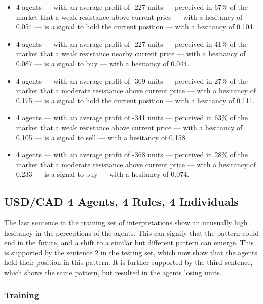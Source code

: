 {\small
  \begin{itemize}
  \item 4 agents — with an average profit of -227 units — perceived in 67\% of
    the market that a weak resistance above current price — with a hesitancy of
    0.054 — is a signal to hold the current position — with a hesitancy of
    0.104.
  \item 4 agents — with an average profit of -227 units — perceived in 41\% of
    the market that a weak resistance nearby current price — with a hesitancy of
    0.087 — is a signal to buy — with a hesitancy of 0.044.
  \item 4 agents — with an average profit of -309 units — perceived in 27\% of
    the market that a moderate resistance above current price — with a hesitancy
    of 0.175 — is a signal to hold the current position — with a hesitancy of
    0.111.
  \item 4 agents — with an average profit of -341 units — perceived in 63\% of
    the market that a weak resistance above current price — with a hesitancy of
    0.105 — is a signal to sell — with a hesitancy of 0.158.
  \item 4 agents — with an average profit of -368 units — perceived in 28\% of
    the market that a moderate resistance above current price — with a hesitancy
    of 0.233 — is a signal to buy — with a hesitancy of 0.074.
  \end{itemize}
}





\subsection{USD/CAD 4 Agents, 4 Rules, 4 Individuals}
\label{}

The last sentence in the training set of interpretations show an unusually high hesitancy in the perceptions of the agents. This can signify that the pattern could end in the future, and a shift to a similar but different pattern can emerge. This is supported by the sentence 2 in the testing set, which now show that the agents held their position in this pattern. It is further supported by the third sentence, which shows the same pattern, but resulted in the agents losing units.

\subsubsection{Training}
\label{}

